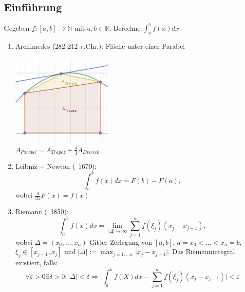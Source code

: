 \subsection{Einführung}

\begin{problem}
Gegeben $f: [a,b] \rightarrow \mathbb{N}$ mit $a, b \in \mathbb{R}$.
Berechne $\int_a^b f(x) dx $
\end{problem}

\begin{example}\leavevmode
\begin{enumerate}
  \item Archimedes (282-212 v.Chr.): Fläche unter einer Parabel \\ \\
    \includegraphics[width=5cm]{Kapitel_1/Grafiken/Grafik_1.png} \\
    $A_{Parabel} = A_{Trapez} + \frac{4}{3} A_{Dreieck}$
  \item Leibniz + Newton (~1670):
    $$ \int_a^b f(x) dx = F(b) - F(a),$$ wobei $\frac{d}{dx} F(x) = f(x)$
  \item Riemann (~1850): 
    $$ \int_a^b f(x) dx = \lim\limits_{\vert \Delta \vert \to \infty} \sum_{j=1}^n f(\xi_j)(x_j - x_{j-1}),$$
    wobei $\Delta = (x_0,...,x_n)$ Gitter Zerlegung von $[a, b]$, $a=x_0 < ...< x_n = b$, $\xi_j \in [x_{j-1}, x_j]$ und $\vert \Delta \vert := \max_{j=1,...n} \vert x_j - x_{j-1} \vert$.
    Das Riemannintegral existiert, falls: 
    $$ \forall \varepsilon > 0 \exists \delta > 0: \vert \Delta \vert < \delta \Rightarrow \vert \int_a^b f(X) dx - \sum_{j=1}^n f(\xi_j)(x_j-x_{j-1}) \vert < \varepsilon $$
\end{enumerate}
\end{example}

